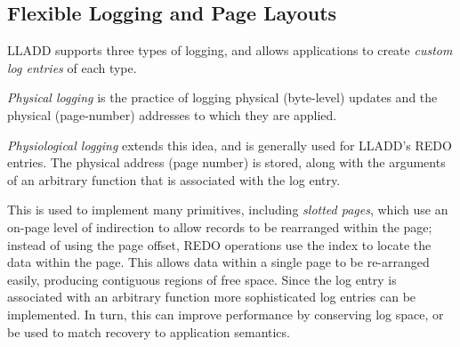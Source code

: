 \documentclass[10pt,letterpaper,twocolumn,english]{article}
\newcommand{\yad}{LLADD\xspace}
\begin{document}
%


\subsection{Flexible Logging and Page Layouts}
\label{flex-logging}
\label{page-layouts}

\yad supports three types of logging, and allows applications to create
{\em custom log entries} of each type.

{\em Physical logging } 
is the practice of logging physical (byte-level) updates
and the physical (page-number) addresses to which they are applied.

{\em Physiological logging } extends this idea, and is generally used 
for \yad's REDO entries.  The physical address (page number) is
stored, along with the arguments of an arbitrary function that 
is associated with the log entry.

This is used to implement many primitives, including {\em slotted pages}, which use
an on-page level of indirection to allow records to be rearranged
within the page; instead of using the page offset, REDO operations use
the index to locate the data within the page. This allows data within a single
page to be re-arranged easily, producing contiguous regions of
free space.  Since the log entry is associated with an arbitrary function
more sophisticated log entries can be implemented.  In turn, this can improve 
performance by conserving log space, or be used to match recovery to application
semantics.

\end{document}
